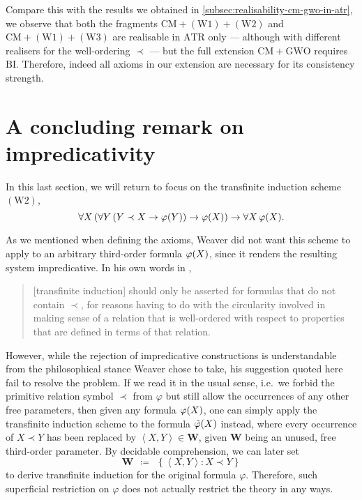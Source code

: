 \documentclass[11pt]{article}
\theoremstyle{plain}
\theoremstyle{definition}
\newcommand{\tuple}[1]{\left\langle #1 \right\rangle}
\begin{document}
Compare this with the results we obtained in \autoref{subsec:realisability-cm-gwo-in-atr}, we observe that both the fragments $\mathrm{CM} + \left(\mathrm{W}1\right) + \left(\mathrm{W}2\right)$ and $\mathrm{CM} + \left(\mathrm{W}1\right) + \left(\mathrm{W}3\right)$ are realisable in $\mathrm{ATR}$ only --- although with different realisers for the well-ordering $\prec$ --- but the full extension $\mathrm{CM} + \mathrm{GWO}$ requires $\mathrm{BI}$. Therefore, indeed all axioms in our extension are necessary for its consistency strength.

\section{A concluding remark on impredicativity}
\label{sec:impredicativity}

In this last section, we will return to focus on the transfinite induction scheme $\left(\mathrm{W}2\right)$,
\[\forall X \left(\forall Y \left(Y \prec X \rightarrow \varphi\mleft(Y\mright)\right) \rightarrow \varphi\mleft(X\mright)\right) \rightarrow \forall X \, \varphi\mleft(X\mright).\]

As we mentioned when defining the axioms, Weaver did not want this scheme to apply to an arbitrary third-order formula $\varphi\mleft(X\mright)$, since it renders the resulting system impredicative. In his own words in \cite{weaver09-cm},
\begin{quote}
    [transfinite induction] should only be asserted for formulas that do not contain $\prec$, for reasons having to do with the circularity involved in making sense of a relation that is well-ordered with respect to properties that are defined in terms of that relation.
\end{quote}

However, while the rejection of impredicative constructions is understandable from the philosophical stance Weaver chose to take, his suggestion quoted here fail to resolve the problem. If we read it in the usual sense, i.e.\ we forbid the primitive relation symbol $\prec$ from $\varphi$ but still allow the occurrences of any other free parameters, then given any formula $\varphi\mleft(X\mright)$, one can simply apply the transfinite induction scheme to the formula $\tilde{\varphi}\mleft(X\mright)$ instead, where every occurrence of $X \prec Y$ has been replaced by $\tuple{X, Y} \in \mathbf{W}$, given $\mathbf{W}$ being an unused, free third-order parameter. By decidable comprehension, we can later set
\[\mathbf{W} \ \ \coloneqq \ \ \left\{\tuple{X, Y} : X \prec Y\right\}\]
to derive transfinite induction for the original formula $\varphi$. Therefore, such superficial restriction on $\varphi$ does not actually restrict the theory in any ways.
\end{document}
